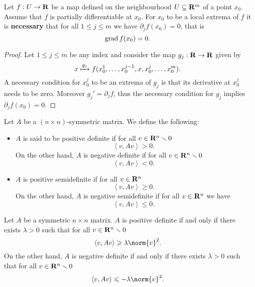 \begin{theorem}
  \label{thm:local-extrema-necessary-condition}
  Let \(f: U \to \mathbf{R}\) be a map defined on the neighbourhood \(U \subseteq \mathbf{R}^{m}\) of a
  point \(x_0\). Assume that \(f\) is partially differentiable at \(x_0\). For
  \(x_0\) to be a local extrema of \(f\) it is \textbf{necessary} that for all
  \(1 \leq j \leq m\) we have \(\partial_jf(x_0) = 0\), that is
  \[
    \operatorname{grad} f(x_0) = 0.
  \]
\end{theorem}

\begin{proof}
  Let \(1 \leq j \leq m\) be any index and consider the map \(g_{j}: \mathbf{R} \to \mathbf{R}\) given
  by
  \[
    x \xmapsto{g_j} f(x_0^1, \dots, x_0^{j-1}, x, x_0^j, \dots, x_0^m).
  \]
  A necessary condition for \(x_0^j\) to be an extrema of \(g_j\) is that its
  derivative at \(x_0^j\) needs to be zero. Moreover \(g_j' = \partial_{j} f\), thus
  the necessary condition for \(g_j\) implies \(\partial_jf(x_0) = 0\).
\end{proof}

\begin{definition}
  \label{def:symmetric-matrix-definiteness}
  Let \(A\) be a \((n \times n)\)-symmetric matrix. We define the following:
  \begin{itemize}\setlength\itemsep{0em}
    \item \(A\) is said to be positive definite if for all \(v \in \mathbf{R}^n \smallsetminus 0\)
    \[
      \left\langle v, Av \right\rangle > 0.
    \]
    On the other hand, \(A\) is negative definite if for all \(v \in \mathbf{R}^n \smallsetminus 0\)
    \[
      \left\langle v, Av \right\rangle < 0.
    \]
    \item \(A\) is positive semidefinite if for all \(v \in \mathbf{R}^n\)
    \[
      \left\langle v, Av \right\rangle \geq 0.
    \]
    On the other hand, \(A\) is negative semidefinite if for all \(v \in \mathbf{R}^n\) we
    have
    \[
      \left\langle v, Av \right\rangle \leq 0.
    \]
  \end{itemize}
\end{definition}

\begin{lemma}
  \label{lem:pos-neg-definite-lambda}
  Let \(A\) be a symmetric \(n \times n\) matrix. \(A\) is positive definite if and
  only if there exists \(\lambda > 0\) such that for all \(v \in \mathbf{R}^n \smallsetminus 0\)
  \[
    \left\langle v, A v \right\rangle \geq \lambda \norm{v}^2.
  \]
  On the other hand, \(A\) is negative definite if and only if there exists \(\lambda
  > 0\) such that for all \(v \in \mathbf{R}^n \smallsetminus 0\)
  \[
    \left\langle v, A v \right\rangle \leq - \lambda \norm{v}^2.
  \]
\end{lemma}

